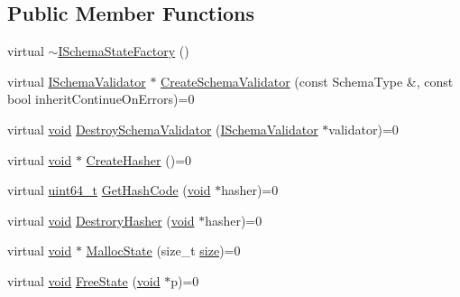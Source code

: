 \subsection*{Public Member Functions}
\begin{DoxyCompactItemize}
\item 
virtual \hyperlink{classinternal_1_1ISchemaStateFactory_ae769eac75f9561fc8d0da7fadad2f6b4}{$\sim$\+I\+Schema\+State\+Factory} ()
\item 
virtual \hyperlink{classinternal_1_1ISchemaValidator}{I\+Schema\+Validator} $\ast$ \hyperlink{classinternal_1_1ISchemaStateFactory_aa9420905f406101f930bca3c9ca3a865}{Create\+Schema\+Validator} (const Schema\+Type \&, const bool inherit\+Continue\+On\+Errors)=0
\item 
virtual \hyperlink{imgui__impl__opengl3__loader_8h_ac668e7cffd9e2e9cfee428b9b2f34fa7}{void} \hyperlink{classinternal_1_1ISchemaStateFactory_a112cbf154077050bc30ffe670032442c}{Destroy\+Schema\+Validator} (\hyperlink{classinternal_1_1ISchemaValidator}{I\+Schema\+Validator} $\ast$validator)=0
\item 
virtual \hyperlink{imgui__impl__opengl3__loader_8h_ac668e7cffd9e2e9cfee428b9b2f34fa7}{void} $\ast$ \hyperlink{classinternal_1_1ISchemaStateFactory_a4ac37b9d3e9526004c82692473f978f4}{Create\+Hasher} ()=0
\item 
virtual \hyperlink{stdint_8h_aec6fcb673ff035718c238c8c9d544c47}{uint64\+\_\+t} \hyperlink{classinternal_1_1ISchemaStateFactory_addfcf00963cc777edf642b204f07c8d6}{Get\+Hash\+Code} (\hyperlink{imgui__impl__opengl3__loader_8h_ac668e7cffd9e2e9cfee428b9b2f34fa7}{void} $\ast$hasher)=0
\item 
virtual \hyperlink{imgui__impl__opengl3__loader_8h_ac668e7cffd9e2e9cfee428b9b2f34fa7}{void} \hyperlink{classinternal_1_1ISchemaStateFactory_a70b8d88180d2e6993105b17f19101635}{Destrory\+Hasher} (\hyperlink{imgui__impl__opengl3__loader_8h_ac668e7cffd9e2e9cfee428b9b2f34fa7}{void} $\ast$hasher)=0
\item 
virtual \hyperlink{imgui__impl__opengl3__loader_8h_ac668e7cffd9e2e9cfee428b9b2f34fa7}{void} $\ast$ \hyperlink{classinternal_1_1ISchemaStateFactory_ada92ebf8e9ef994f7e20a0f7f9750519}{Malloc\+State} (size\+\_\+t \hyperlink{imgui__impl__opengl3__loader_8h_a3d1e3edfcf61ca2d831883e1afbad89e}{size})=0
\item 
virtual \hyperlink{imgui__impl__opengl3__loader_8h_ac668e7cffd9e2e9cfee428b9b2f34fa7}{void} \hyperlink{classinternal_1_1ISchemaStateFactory_a27bd2138940cac3c330dd8399c49b22b}{Free\+State} (\hyperlink{imgui__impl__opengl3__loader_8h_ac668e7cffd9e2e9cfee428b9b2f34fa7}{void} $\ast$p)=0
\end{DoxyCompactItemize}


